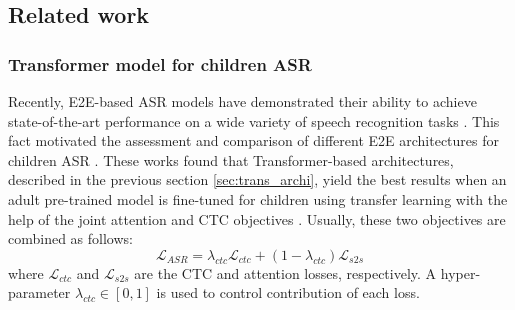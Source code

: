 

\subsection{Related work}
\label{section:SOA}
\subsubsection{Transformer model for children ASR}
Recently, E2E-based ASR models have demonstrated their ability to achieve state-of-the-art performance on a wide variety of speech recognition tasks \cite{hmm-end2end}. This fact motivated the assessment and comparison of different E2E architectures for children ASR \cite{sri_end2end,gelin2021endtoend}. These works found that Transformer-based architectures, described in the previous section \ref{sec:trans_archi}, yield the best results when an adult pre-trained model is fine-tuned for children using transfer learning with the help of the joint attention and CTC objectives \cite{First_End2End}. Usually, these two objectives are combined  as follows:
\begin{equation} \label{equa:loss_asr}
    \mathcal{L}_{ASR} = \lambda_{ctc} \mathcal{L}_{ctc} + (1- \lambda_{ctc})\mathcal{L}_{s2s}
\end{equation}
where $\mathcal{L}_{ctc}$ and $\mathcal{L}_{s2s}$ are the CTC and attention losses, respectively. A hyper-parameter $\lambda_{ctc} \in [0,1]$ is used to control contribution of each loss. 
